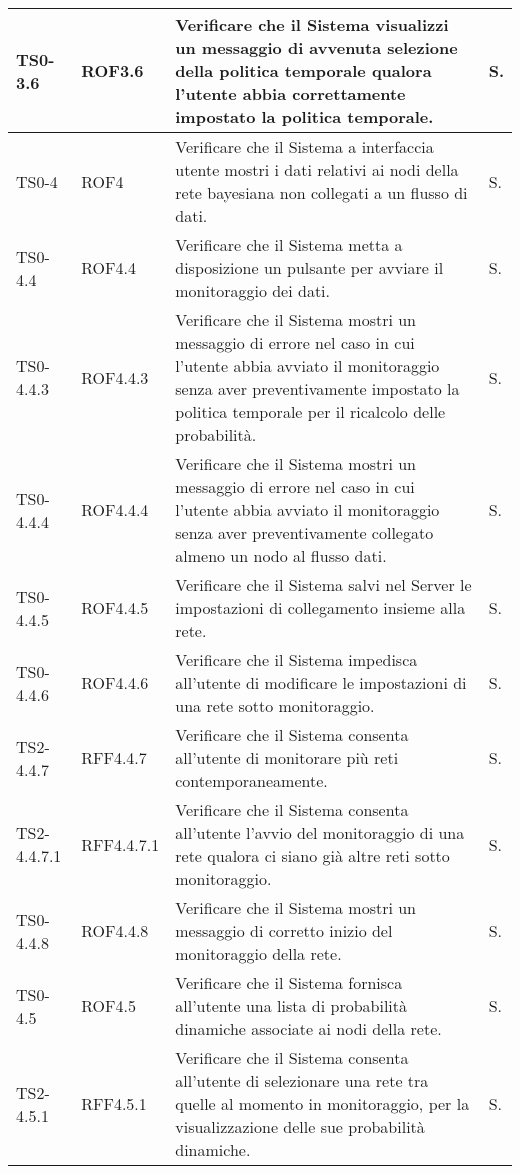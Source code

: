 \begin{longtable}{|C{.15\textwidth}|C{.14\textwidth}|m{.51\textwidth}|C{.08\textwidth}|}
\hline
TS0-3.6 & ROF3.6 & Verificare che il Sistema visualizzi un messaggio di avvenuta selezione della politica temporale qualora l'utente abbia correttamente impostato la politica temporale. & S. \\
\hline
{}TS0-4 & ROF4 & Verificare che il Sistema a interfaccia utente mostri i dati relativi ai nodi della rete bayesiana non collegati a un flusso di dati. & S. \\
\hline
TS0-4.4 & ROF4.4 & Verificare che il Sistema metta a disposizione un pulsante per avviare il monitoraggio dei dati. & S. \\
\hline
{}TS0-4.4.3 & ROF4.4.3 & Verificare che il Sistema mostri un messaggio di errore nel caso in cui l'utente abbia avviato il monitoraggio senza aver preventivamente impostato la politica temporale per il ricalcolo delle probabilità. & S. \\
\hline
TS0-4.4.4 & ROF4.4.4 & Verificare che il Sistema mostri un messaggio di errore nel caso in cui l'utente abbia avviato il monitoraggio senza aver preventivamente  collegato almeno un nodo al flusso dati. & S. \\
\hline
{}TS0-4.4.5 & ROF4.4.5 & Verificare che il Sistema salvi nel Server le impostazioni di collegamento insieme alla rete. & S. \\
\hline
TS0-4.4.6 & ROF4.4.6 & Verificare che il Sistema impedisca all'utente di modificare le impostazioni di una rete sotto monitoraggio. & S. \\
\hline
{}TS2-4.4.7 & RFF4.4.7 & Verificare che il Sistema consenta all'utente di monitorare più reti contemporaneamente. & S. \\
\hline
TS2-4.4.7.1 & RFF4.4.7.1 & Verificare che il Sistema consenta all'utente l'avvio del monitoraggio di una rete qualora ci siano già altre reti sotto monitoraggio. & S. \\
\hline
{}TS0-4.4.8 & ROF4.4.8 & Verificare che il Sistema mostri un messaggio di corretto inizio del monitoraggio della rete. & S. \\
\hline
TS0-4.5 & ROF4.5 & Verificare che il Sistema fornisca all'utente una lista di probabilità dinamiche associate ai nodi della rete. & S. \\
\hline
{}TS2-4.5.1 & RFF4.5.1 & Verificare che il Sistema consenta all'utente di selezionare una rete tra quelle al momento in monitoraggio, per la visualizzazione delle sue probabilità dinamiche. & S. \\

\end{longtable}
